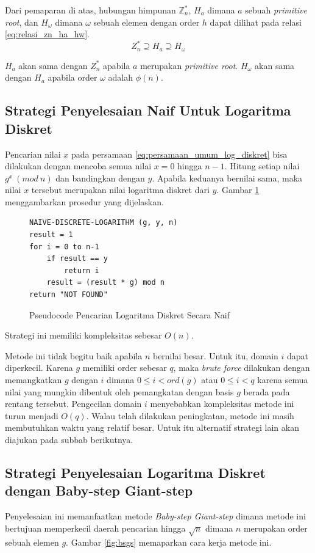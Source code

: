 Dari pemaparan di atas, hubungan himpunan $ \mathbb{Z}_n^* $, $ H_a $ dimana $ a $ sebuah \textit{primitive root}, dan $ H_{\omega} $ dimana $ \omega $ sebuah elemen dengan order $ h $ dapat dilihat pada relasi \eqref{eq:relasi_zn_ha_hw}.
\begin{equation}
Z_n^*\supseteq H_a\supseteq H_{\omega}
\label{eq:relasi_zn_ha_hw}
\end{equation}

$ H_a $ akan sama dengan $ Z_n^* $ apabila $ a $ merupakan \textit{primitive root}. $ H_{\omega} $ akan sama dengan $ H_a $ apabila order $ {\omega} $ adalah $ \phi(n) $.

\subsection{Strategi Penyelesaian Naif Untuk Logaritma Diskret}
Pencarian nilai $ x $ pada persamaan \eqref{eq:persamaan_umum_log_diskret} bisa dilakukan dengan mencoba semua nilai $ x = 0 $ hingga $ n-1 $. Hitung setiap nilai $ g^x\ (mod\ n) $ dan bandingkan dengan $ y $. Apabila keduanya bernilai sama, maka nilai $ x $ tersebut merupakan nilai logaritma diskret dari $ y $. Gambar \ref{psdo:disc_log_naive} menggambarkan prosedur yang dijelaskan.
\begin{figure}[h!]
\begin{lstlisting}[firstnumber=0]
NAIVE-DISCRETE-LOGARITHM (g, y, n)
result = 1
for i = 0 to n-1
	if result == y
		return i
	result = (result * g) mod n
return "NOT FOUND"
\end{lstlisting}
\caption{Pseudocode Pencarian Logaritma Diskret Secara Naif}
\label{psdo:disc_log_naive}
\end{figure}
Strategi ini memiliki kompleksitas sebesar $ O(n) $.

Metode ini tidak begitu baik apabila $ n $ bernilai besar. Untuk itu, domain $ i $ dapat diperkecil. Karena $ g $ memiliki order sebesar $ q $, maka \textit{brute force} dilakukan dengan memangkatkan $ g $ dengan $ i $ dimana $ 0\leq i < ord(g) $ atau $ 0 \leq i < q $ karena semua nilai yang mungkin dibentuk oleh pemangkatan dengan basis $ g $ berada pada rentang tersebut. Pengecilan domain $ i $ menyebabkan kompleksitas metode ini turun menjadi $ O(q) $. Walau telah dilakukan peningkatan, metode ini masih membutuhkan waktu yang relatif besar. Untuk itu alternatif strategi lain akan diajukan pada subbab berikutnya.

\subsection {Strategi Penyelesaian Logaritma Diskret dengan Baby-step Giant-step}
Penyelesaian ini memanfaatkan metode \textit{Baby-step Giant-step} dimana metode ini bertujuan memperkecil daerah pencarian hingga $ \sqrt{n} $ dimana $ n $ merupakan order sebuah elemen $ g $. Gambar \ref{fig:bsgs} memaparkan cara kerja metode ini.

